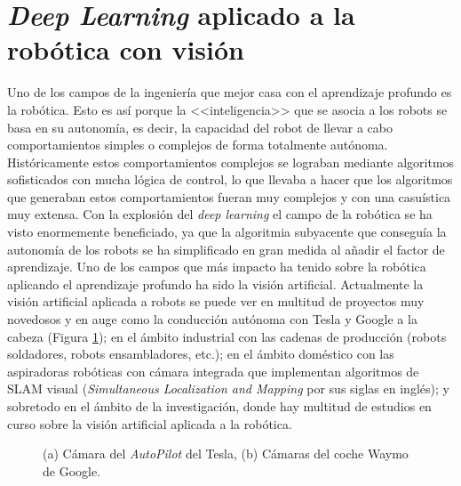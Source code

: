 \section{\textit{Deep Learning} aplicado a la robótica con visión}
\label{sec:robolearnvision}

Uno de los campos de la ingeniería que mejor casa con el aprendizaje profundo es la robótica. Esto es así porque la <<inteligencia>> que se asocia a los robots se basa en su autonomía, es decir, la capacidad del robot de llevar a cabo comportamientos simples o complejos de forma totalmente autónoma. Históricamente estos comportamientos complejos se lograban mediante algoritmos sofisticados con mucha lógica de control, lo que llevaba a hacer que los algoritmos que generaban estos comportamientos fueran muy complejos y con una casuística muy extensa. Con la explosión del \textit{deep learning} el campo de la robótica se ha visto enormemente beneficiado, ya que la algoritmia subyacente que conseguía la autonomía de los robots se ha simplificado en gran medida al añadir el factor de aprendizaje. Uno de los campos que más impacto ha tenido sobre la robótica aplicando el aprendizaje profundo ha sido la visión artificial. Actualmente la visión artificial aplicada a robots se puede ver en multitud de proyectos muy novedosos y en auge como la conducción autónoma con Tesla y Google a la cabeza (Figura \ref{fig:cameras}); en el ámbito industrial con las cadenas de producción (robots soldadores, robots ensambladores, etc.); en el ámbito doméstico con las aspiradoras robóticas con cámara integrada que implementan algoritmos de SLAM visual (\textit{Simultaneous Localization and Mapping} por sus siglas en inglés); y sobretodo en el ámbito de la investigación, donde hay multitud de estudios en curso sobre la visión artificial aplicada a la robótica.

\begin{figure}
	\begin{center}
		\hspace{0.1cm}
	\end{center}
	\centering
	\captionsetup{justification=centering,margin=2cm}
	\caption{(a) Cámara del \textit{AutoPilot} del Tesla, (b) Cámaras del coche Waymo de Google.}
	\label{fig:cameras}
\end{figure}


